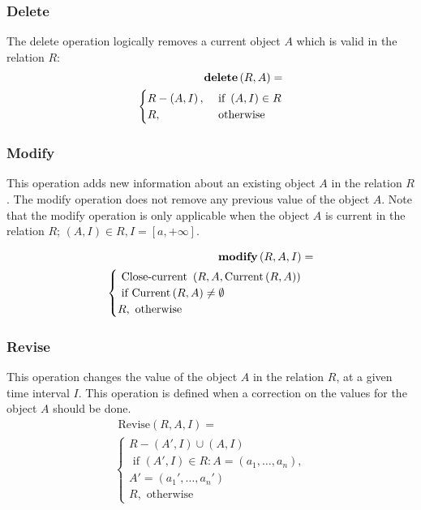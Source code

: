\subsubsection{\label{subsubsec:del}Delete}
The delete operation logically removes a current object $A$ which is valid in the relation $R$:
\begin{align}
\label{eq:delete}
\mbox{\textbf{delete}} \left(R ,A \right) =\\
\begin{cases}
\nonumber
R - \left(A, I \right), & \mbox{ if } \left( A, I \right) \in R\\
R, & \mbox{ otherwise }  
\end{cases} 	
\end{align}


\subsubsection{\label{subsubsec:modify}Modify}
This operation adds new information about an existing object $A$ in the relation $R$. The modify operation does not remove any previous value of the object $A$.
Note that the modify operation is only applicable when the object $A$ is current in the relation $R$; $ \left(A, I \right) \in R, I = \left[a, +\infty \right]$.

\begin{align}
\label{eq:modify}
\mbox{\textbf{modify}} \left( R, A, I \right) =\\
\begin{cases}
\nonumber
\mbox{ Close-current }\left(R, A, \mbox{Current}\left(R, A \right) \right) \\
 \mbox{ if Current}\left(R ,A \right) \neq \emptyset \\
 R,  \mbox{ otherwise }
\end{cases}
\end{align}

\subsubsection{\label{subsubsec:revise}Revise}
This operation changes the value of the object $A$ in the relation $R$, at a given time interval $I$. This operation is defined when a correction on the values for the object $A$ should be done.
\begin{align}
\label{eq:revise}
\mbox{ Revise}\left(R, A, I \right)=\\
\begin{cases}
\nonumber
 R - \left(A', I \right) \cup \left(A, I \right)  \\
  \mbox{ if } \left(A', I \right) \in R: A = \left(a_1, \ldots, a_n \right),\\
A'= \left(a_1', \ldots, a_n' \right)   \\   
R,  \mbox{ otherwise }
\end{cases}
\end{align} 